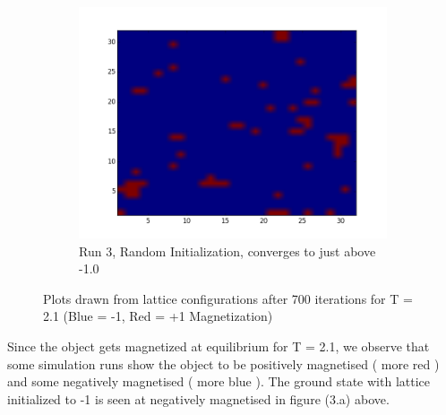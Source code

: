\documentclass[a4paper,11pt]{article}
\begin{document}
\begin{figure}[!htb]
\begin{subfigure}[b]{0.5\textwidth}
	    \label{fig:lat2_2}
    \end{subfigure}
    \begin{subfigure}[b]{0.5\textwidth}
        \centering
        \includegraphics[scale=0.40]{2_run_3.png}
        \caption{Run 3, Random Initialization, converges to just above -1.0}
	    \label{fig:lat2_3}
    \end{subfigure}
    \caption{Plots drawn from lattice configurations after 700 iterations for T = 2.1 (Blue = -1, Red = +1 Magnetization)}
\end{figure}
Since the object gets magnetized at equilibrium for T = 2.1, we observe that some simulation runs show the object to be positively magnetised ( more red ) and some negatively magnetised ( more blue ). The ground state with lattice initialized to -1 is seen at negatively magnetised in figure (3.a) above. 
\clearpage
\end{document}
